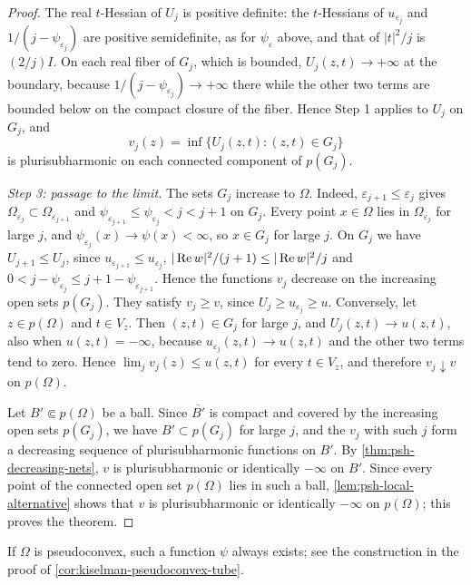\begin{proof}
The real $t$-Hessian of $U_j$ is positive definite: the $t$-Hessians of $u_{\varepsilon_j}$ and $1/(j-\psi_{\varepsilon_j})$ are positive semidefinite, as for $\psi_\varepsilon$ above, and that of $|t|^2/j$ is $(2/j)I$. On each real fiber of $G_j$, which is bounded, $U_j(z,t)\to+\infty$ at the boundary, because $1/(j-\psi_{\varepsilon_j})\to+\infty$ there while the other two terms are bounded below on the compact closure of the fiber. Hence Step 1 applies to $U_j$ on $G_j$, and
\[
 v_j(z)=\inf\{U_j(z,t):(z,t)\in G_j\}
\]
is plurisubharmonic on each connected component of $p(G_j)$.

\emph{Step 3: passage to the limit.} The sets $G_j$ increase to $\Omega$. Indeed, $\varepsilon_{j+1}\leq\varepsilon_j$ gives $\Omega_{\varepsilon_j}\subset\Omega_{\varepsilon_{j+1}}$ and $\psi_{\varepsilon_{j+1}}\leq\psi_{\varepsilon_j}<j<j+1$ on $G_j$. Every point $x\in\Omega$ lies in $\Omega_{\varepsilon_j}$ for large $j$, and $\psi_{\varepsilon_j}(x)\to\psi(x)<\infty$, so $x\in G_j$ for large $j$. On $G_j$ we have $U_{j+1}\leq U_j$, since $u_{\varepsilon_{j+1}}\leq u_{\varepsilon_j}$, $|\operatorname{Re} w|^2/(j+1)\leq|\operatorname{Re} w|^2/j$ and $0<j-\psi_{\varepsilon_j}\leq j+1-\psi_{\varepsilon_{j+1}}$. Hence the functions $v_j$ decrease on the increasing open sets $p(G_j)$. They satisfy $v_j\geq v$, since $U_j\geq u_{\varepsilon_j}\geq u$. Conversely, let $z\in p(\Omega)$ and $t\in V_z$. Then $(z,t)\in G_j$ for large $j$, and $U_j(z,t)\to u(z,t)$, also when $u(z,t)=-\infty$, because $u_{\varepsilon_j}(z,t)\to u(z,t)$ and the other two terms tend to zero. Hence $\lim_jv_j(z)\leq u(z,t)$ for every $t\in V_z$, and therefore $v_j\downarrow v$ on $p(\Omega)$.

Let $B'\Subset p(\Omega)$ be a ball. Since $\overline{B'}$ is compact and covered by the increasing open sets $p(G_j)$, we have $B'\subset p(G_j)$ for large $j$, and the $v_j$ with such $j$ form a decreasing sequence of plurisubharmonic functions on $B'$. By \cref{thm:psh-decreasing-nets}, $v$ is plurisubharmonic or identically $-\infty$ on $B'$. Since every point of the connected open set $p(\Omega)$ lies in such a ball, \cref{lem:psh-local-alternative} shows that $v$ is plurisubharmonic or identically $-\infty$ on $p(\Omega)$; this proves the theorem.
\end{proof}

If $\Omega$ is pseudoconvex, such a function $\psi$ always exists; see the construction in the proof of \cref{cor:kiselman-pseudoconvex-tube}.

